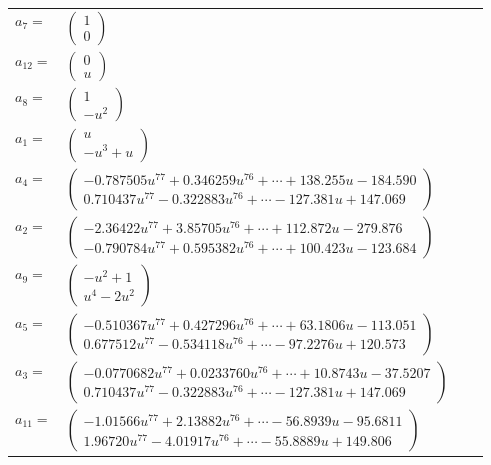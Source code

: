\documentclass[1p]{elsarticle_modified}
\theoremstyle{definition}
\begin{document}
\begin{tabular}{m{7pt} m{180pt} m{7pt} m{180pt} }
\flushright $a_{7}=$&$\begin{pmatrix}1\\0\end{pmatrix}$ \\
\flushright $a_{12}=$&$\begin{pmatrix}0\\u\end{pmatrix}$ \\
\flushright $a_{8}=$&$\begin{pmatrix}1\\- u^2\end{pmatrix}$ \\
\flushright $a_{1}=$&$\begin{pmatrix}u\\- u^3+u\end{pmatrix}$ \\
\flushright $a_{4}=$&$\begin{pmatrix}-0.787505 u^{77}+0.346259 u^{76}+\cdots+138.255 u-184.590\\0.710437 u^{77}-0.322883 u^{76}+\cdots-127.381 u+147.069\end{pmatrix}$ \\
\flushright $a_{2}=$&$\begin{pmatrix}-2.36422 u^{77}+3.85705 u^{76}+\cdots+112.872 u-279.876\\-0.790784 u^{77}+0.595382 u^{76}+\cdots+100.423 u-123.684\end{pmatrix}$ \\
\flushright $a_{9}=$&$\begin{pmatrix}- u^2+1\\u^4-2 u^2\end{pmatrix}$ \\
\flushright $a_{5}=$&$\begin{pmatrix}-0.510367 u^{77}+0.427296 u^{76}+\cdots+63.1806 u-113.051\\0.677512 u^{77}-0.534118 u^{76}+\cdots-97.2276 u+120.573\end{pmatrix}$ \\
\flushright $a_{3}=$&$\begin{pmatrix}-0.0770682 u^{77}+0.0233760 u^{76}+\cdots+10.8743 u-37.5207\\0.710437 u^{77}-0.322883 u^{76}+\cdots-127.381 u+147.069\end{pmatrix}$ \\
\flushright $a_{11}=$&$\begin{pmatrix}-1.01566 u^{77}+2.13882 u^{76}+\cdots-56.8939 u-95.6811\\1.96720 u^{77}-4.01917 u^{76}+\cdots-55.8889 u+149.806\end{pmatrix}$ \\

\end{tabular}
\end{document}
